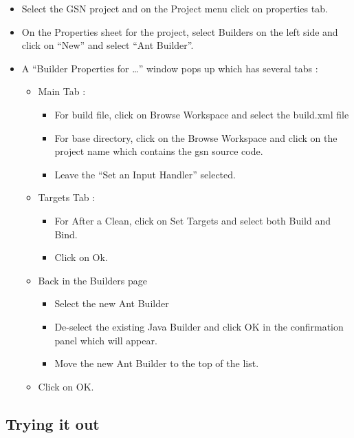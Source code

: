 \begin{itemize}
	\item Select the GSN project and on the Project menu click on properties
tab.
	\item On the Properties sheet for the project, select Builders on the left
side and click on \textquotedblleft{}New\textquotedblright{} and select
\textquotedblleft{}Ant Builder\textquotedblright{}.
	\item A \textquotedblleft{}Builder Properties for
\ldots{}\textquotedblright{} window pops up which has several tabs :
\begin{itemize}
	\item Main Tab :
\begin{itemize}
	\item For build file, click on Browse Workspace and select the build.xml
file
	\item For base directory, click on the Browse Workspace and click on the
project name which contains the gsn source code.
	\item Leave the \textquotedblleft{}Set an Input Handler\textquotedblright{}
selected.
\end{itemize}

	\item Targets Tab :
\begin{itemize}
	\item For After a Clean, click on Set Targets and select both Build and
Bind.
	\item Click on Ok.
\end{itemize}

	\item Back in the Builders page
\begin{itemize}
	\item Select the new Ant Builder
	\item De-select the existing Java Builder and click OK in the confirmation
panel which will appear.
	\item Move the new Ant Builder to the top of the list.
\end{itemize}

	\item Click on OK.
\end{itemize}

\end{itemize}

\subsection{Trying it out}

